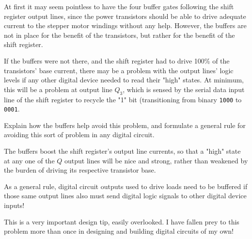 

At first it may seem pointless to have the four buffer gates following the shift register output lines, since the power transistors should be able to drive adequate current to the stepper motor windings without any help.  However, the buffers are not in place for the benefit of the transistors, but rather for the benefit of the shift register.

If the buffers were not there, and the shift register had to drive 100\% of the transistors' base current, there may be a problem with the output lines' logic levels if any other digital device needed to read their "high" states.  At minimum, this will be a problem at output line $Q_3$, which is sensed by the serial data input line of the shift register to recycle the "1" bit (transitioning from binary {\tt 1000} to {\tt 0001}.

Explain how the buffers help avoid this problem, and formulate a general rule for avoiding this sort of problem in any digital circuit.







The buffers boost the shift register's output line currents, so that a "high" state at any one of the $Q$ output lines will be nice and strong, rather than weakened by the burden of driving its respective transistor base.

As a general rule, digital circuit outputs used to drive loads need to be buffered if those same output lines also must send digital logic signals to other digital device inputs!







This is a very important design tip, easily overlooked.  I have fallen prey to this problem more than once in designing and building digital circuits of my own!




